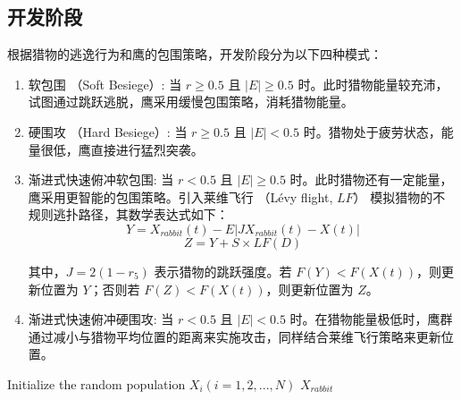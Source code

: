 \documentclass{wzuthesis}
\begin{document}
\subsection{开发阶段}
根据猎物的逃逸行为和鹰的包围策略，开发阶段分为以下四种模式：
\begin{enumerate}
\item[（1）] 软包围 （Soft Besiege）: 当 $r \geq 0.5$ 且 $|E| \geq 0.5$ 时。此时猎物能量较充沛，试图通过跳跃逃脱，鹰采用缓慢包围策略，消耗猎物能量。
\item[（2）] 硬围攻 （Hard Besiege）: 当 $r \geq 0.5$ 且 $|E| < 0.5$ 时。猎物处于疲劳状态，能量很低，鹰直接进行猛烈突袭。
\item[（3）] 渐进式快速俯冲软包围: 当 $r < 0.5$ 且 $|E| \geq 0.5$ 时。此时猎物还有一定能量，鹰采用更智能的包围策略。引入莱维飞行 （Lévy flight, $LF$） 模拟猎物的不规则逃扑路径，其数学表达式如下：\begin{equation}
   Y = X_{rabbit}(t) - E |J X_{rabbit}(t) - X(t)|
   \end{equation}
   \label{eq:hho-y}
   \begin{equation}
   Z = Y + S \times LF(D)
   \label{eq:hho-z}
\end{equation}

其中，$J = 2(1-r_5)$ 表示猎物的跳跃强度。若 $F(Y) < F(X(t))$，则更新位置为 $Y$；否则若 $F(Z) < F(X(t))$，则更新位置为 $Z$。
\item[（4）] 渐进式快速俯冲硬围攻: 当 $r < 0.5$ 且 $|E| < 0.5$ 时。在猎物能量极低时，鹰群通过减小与猎物平均位置的距离来实施攻击，同样结合莱维飞行策略来更新位置。
\end{enumerate}
\vspace*{2\baselineskip} 

\begin{algorithm}[H]
\caption{Harris Hawks Optimization (HHO)}
\label{alg:HHO}
Initialize the random population $X_i (i = 1, 2, ..., N)$\;
\Return $X_{rabbit}$\
\end{algorithm}
\end{document}
